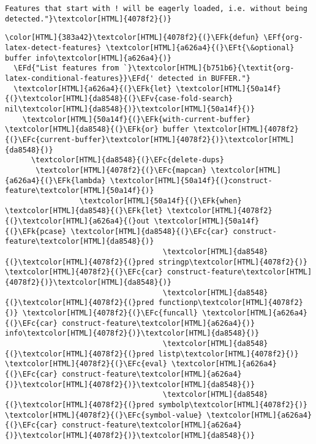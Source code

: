 \documentclass{scrartcl}
\newcommand{\EFk}[1]{\textcolor{EFk}{#1}} %
\newcommand{\EFd}[1]{\textcolor{EFd}{\textit{#1}}} %
\newcommand{\EFt}[1]{\textcolor{EFt}{#1}} %
\newcommand{\EFc}[1]{\textcolor{EFc}{#1}} %
\newcommand{\EFv}[1]{\textcolor{EFv}{#1}} %
\newcommand{\EFf}[1]{\textcolor{EFf}{#1}} %
\begin{document}
\begin{enumerate}
\begin{Code}
\begin{Verbatim}[]
Features that start with ! will be eagerly loaded, i.e. without being detected."}\textcolor[HTML]{4078f2}{)}
\end{Verbatim}
\end{Code}

\begin{Code}
\begin{Verbatim}[]
\color[HTML]{383a42}\textcolor[HTML]{4078f2}{(}\EFk{defun} \EFf{org-latex-detect-features} \textcolor[HTML]{a626a4}{(}\EFt{\&optional} buffer info\textcolor[HTML]{a626a4}{)}
  \EFd{"List features from `}\textcolor[HTML]{b751b6}{\textit{org-latex-conditional-features}}\EFd{' detected in BUFFER."}
  \textcolor[HTML]{a626a4}{(}\EFk{let} \textcolor[HTML]{50a14f}{(}\textcolor[HTML]{da8548}{(}\EFv{case-fold-search} nil\textcolor[HTML]{da8548}{)}\textcolor[HTML]{50a14f}{)}
    \textcolor[HTML]{50a14f}{(}\EFk{with-current-buffer} \textcolor[HTML]{da8548}{(}\EFk{or} buffer \textcolor[HTML]{4078f2}{(}\EFc{current-buffer}\textcolor[HTML]{4078f2}{)}\textcolor[HTML]{da8548}{)}
      \textcolor[HTML]{da8548}{(}\EFc{delete-dups}
       \textcolor[HTML]{4078f2}{(}\EFc{mapcan} \textcolor[HTML]{a626a4}{(}\EFk{lambda} \textcolor[HTML]{50a14f}{(}construct-feature\textcolor[HTML]{50a14f}{)}
                 \textcolor[HTML]{50a14f}{(}\EFk{when} \textcolor[HTML]{da8548}{(}\EFk{let} \textcolor[HTML]{4078f2}{(}\textcolor[HTML]{a626a4}{(}out \textcolor[HTML]{50a14f}{(}\EFk{pcase} \textcolor[HTML]{da8548}{(}\EFc{car} construct-feature\textcolor[HTML]{da8548}{)}
                                    \textcolor[HTML]{da8548}{(}\textcolor[HTML]{4078f2}{(}pred stringp\textcolor[HTML]{4078f2}{)} \textcolor[HTML]{4078f2}{(}\EFc{car} construct-feature\textcolor[HTML]{4078f2}{)}\textcolor[HTML]{da8548}{)}
                                    \textcolor[HTML]{da8548}{(}\textcolor[HTML]{4078f2}{(}pred functionp\textcolor[HTML]{4078f2}{)} \textcolor[HTML]{4078f2}{(}\EFc{funcall} \textcolor[HTML]{a626a4}{(}\EFc{car} construct-feature\textcolor[HTML]{a626a4}{)} info\textcolor[HTML]{4078f2}{)}\textcolor[HTML]{da8548}{)}
                                    \textcolor[HTML]{da8548}{(}\textcolor[HTML]{4078f2}{(}pred listp\textcolor[HTML]{4078f2}{)} \textcolor[HTML]{4078f2}{(}\EFc{eval} \textcolor[HTML]{a626a4}{(}\EFc{car} construct-feature\textcolor[HTML]{a626a4}{)}\textcolor[HTML]{4078f2}{)}\textcolor[HTML]{da8548}{)}
                                    \textcolor[HTML]{da8548}{(}\textcolor[HTML]{4078f2}{(}pred symbolp\textcolor[HTML]{4078f2}{)} \textcolor[HTML]{4078f2}{(}\EFc{symbol-value} \textcolor[HTML]{a626a4}{(}\EFc{car} construct-feature\textcolor[HTML]{a626a4}{)}\textcolor[HTML]{4078f2}{)}\textcolor[HTML]{da8548}{)}

\end{Verbatim}
\end{Code}
\end{enumerate}
\end{document}
